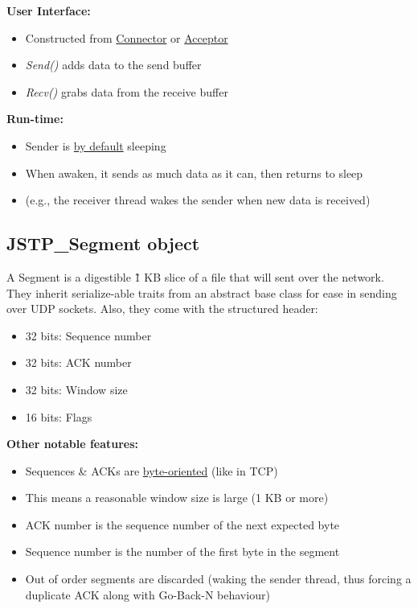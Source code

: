 \documentclass{article}
\begin{document}
\vspace{4mm}
\noindent\textbf{User Interface:}
\begin{itemize}
    \item Constructed from \underline{Connector} or \underline{Acceptor}
    \item \emph{Send()} adds data to the send buffer
    \item \emph{Recv()} grabs data from the receive buffer
\end{itemize}

\vspace{4mm}
\noindent\textbf{Run-time:}
\begin{itemize}
    \item Sender is \underline{by default} sleeping
    \item When awaken, it sends as much data as it can, then returns to sleep
    \item (e.g., the receiver thread wakes the sender when new data is received)
\end{itemize}

\subsection{JSTP\_Segment object}
A Segment is a digestible \~1 KB slice of a file that will sent over the network.
They inherit serialize-able traits from an abstract base class for ease in sending over UDP sockets.
Also, they come with the structured header:

\begin{itemize}
    \item 32 bits: Sequence number
    \item 32 bits: ACK number
    \item 32 bits: Window size
    \item 16 bits: Flags
\end{itemize}

\vspace{4mm}
\noindent\textbf{Other notable features:}
\begin{itemize}
    \item Sequences \& ACKs are \underline{byte-oriented} (like in TCP)
    \item This means a reasonable window size is large (1 KB or more)
    \item ACK number is the sequence number of the next expected byte
    \item Sequence number is the number of the first byte in the segment
    \item Out of order segments are discarded (waking the sender thread, thus forcing a duplicate ACK along with Go-Back-N behaviour)
\end{itemize}
\end{document}

